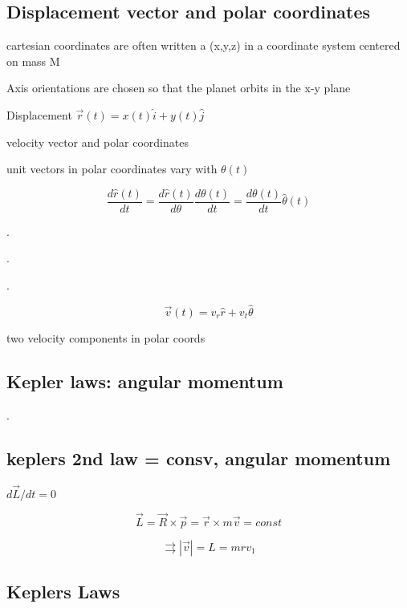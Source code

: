 \documentclass{article}
\begin{document}
\subsection{Displacement vector and polar coordinates}
\begin{list}{-}{}
\item cartesian coordinates are often written a (x,y,z) in a coordinate system centered on mass M
\item Axis orientations are chosen so that the planet orbits in the x-y plane
\item Displacement $\vec{r}(t) =x(t)\hat{i} +y(t)\hat{j}$
\end{list}

velocity vector and polar coordinates
\begin{list}{-}{}
\item unit vectors in polar coordinates vary with $\theta(t)$
\item \[\frac{d\hat{r}(t)}{dt} = \frac{d\hat{r}(t)}{d\theta} \frac{d\theta(t)}{dt} = \frac{d\theta(t)}{dt} \hat{\theta}(t)\]
\item .
\item .
\item .
\item \[\vec{v}(t) = v_r\hat{r} +v_t\hat{\theta}\]
\item two velocity components in polar coords 
\end{list}

\subsection{Kepler laws: angular momentum}
\begin{list}{-}{}
\item .
\end{list}

\subsection{keplers 2nd law = consv, angular momentum}
\begin{list}{-}{}
\item $d\vec{L}/dt=0$
\item \[\vec{L} =\vec{R} \times\vec{p} = \vec{r}\times m\vec{v}= const\]
\item \[\rightrightarrows |\vec{v}|=L = mrv_1\]
\end{list}

\subsection{Keplers Laws}
\end{document}
